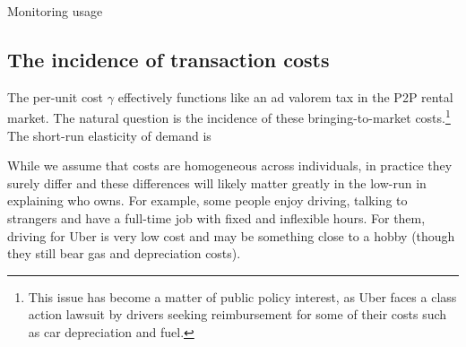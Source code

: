 Monitoring usage 

\subsection{The incidence of transaction costs}
The per-unit cost $\gamma$ effectively functions like an ad valorem tax in the P2P rental market.
The natural question is the incidence of these bringing-to-market costs.\footnote{
 This issue has become a matter of public policy interest, as Uber faces a class action lawsuit by drivers seeking reimbursement for some of their costs such as car depreciation and fuel. 
}
The short-run elasticity of demand is

While we assume that costs are homogeneous across individuals, in practice they surely differ and these differences will likely matter greatly in the low-run in explaining who owns. 
For example, some people enjoy driving, talking to strangers and have a full-time job with fixed and inflexible hours.
For them, driving for Uber is very low cost and may be something close to a hobby (though they still bear gas and depreciation costs).





